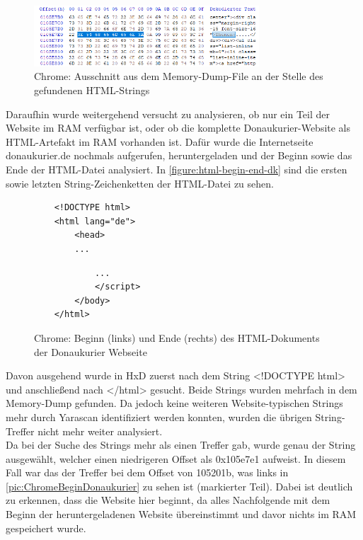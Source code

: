 \begin{figure}[h!]
	\centering
	\includegraphics[width=0.75\textwidth]{bilder/HxDChromeStringThemen_cropped.png}
	\caption{Chrome: Ausschnitt aus dem Memory-Dump-File an der Stelle des gefundenen HTML-Strings}
	\label{pic:ChromeStringThemen}
\end{figure} 

Daraufhin wurde weitergehend versucht zu analysieren, ob nur ein Teil der Website im RAM verfügbar ist, oder ob die komplette Donaukurier-Website als HTML-Artefakt im RAM vorhanden ist. Dafür wurde die Internetseite donaukurier.de nochmals aufgerufen, heruntergeladen und der Beginn sowie das Ende der HTML-Datei analysiert. In \autoref{figure:html-begin-end-dk} sind die ersten sowie letzten String-Zeichenketten der HTML-Datei zu sehen.\\


\begin{figure}[!h]
 \begin{minipage}{0.5\textwidth}
  \centering
	\begin{verbatim}
	<!DOCTYPE html>
	<html lang="de">
		<head>
		...
	\end{verbatim}
 \end{minipage}
 \begin{minipage}{0.5\textwidth}
  \centering
	\begin{verbatim}
			...
	    	</script>
		</body>
	</html>
	\end{verbatim}
 \end{minipage}
\caption{Chrome: Beginn (links) und Ende (rechts) des HTML-Dokuments der Donaukurier Webseite}
  \label{figure:html-begin-end-dk}
\end{figure}


Davon ausgehend wurde in HxD zuerst nach dem String \glqq{}<!DOCTYPE html>\grqq{} und anschließend nach \glqq{}</html>\grqq{} gesucht. Beide Strings wurden mehrfach in dem Memory-Dump gefunden. Da jedoch keine weiteren Website-typischen Strings mehr durch Yarascan identifiziert werden konnten, wurden die übrigen String-Treffer nicht mehr weiter analysiert.\\
Da bei der Suche des Strings mehr als einen Treffer gab, wurde genau der String ausgewählt, welcher einen niedrigeren Offset als 0x105e7e1 aufweist. In diesem Fall war das der Treffer bei dem Offset von 105201b, was links in \autoref{pic:ChromeBeginDonaukurier} zu sehen ist (markierter Teil). Dabei ist deutlich zu erkennen, dass die Website hier beginnt, da alles Nachfolgende mit dem Beginn der heruntergeladenen Website übereinstimmt und davor nichts im RAM gespeichert wurde.

